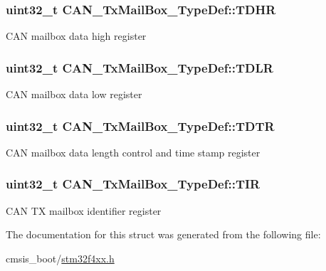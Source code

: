 \subsubsection[{\texorpdfstring{T\+D\+HR}{TDHR}}]{ uint32\+\_\+t C\+A\+N\+\_\+\+Tx\+Mail\+Box\+\_\+\+Type\+Def\+::\+T\+D\+HR}\hypertarget{struct_c_a_n___tx_mail_box___type_def_a98c6bcd7c9bae378ebf83fd9f5b59020}{}\label{struct_c_a_n___tx_mail_box___type_def_a98c6bcd7c9bae378ebf83fd9f5b59020}
C\+AN mailbox data high register 
\subsubsection[{\texorpdfstring{T\+D\+LR}{TDLR}}]{ uint32\+\_\+t C\+A\+N\+\_\+\+Tx\+Mail\+Box\+\_\+\+Type\+Def\+::\+T\+D\+LR}\hypertarget{struct_c_a_n___tx_mail_box___type_def_a408c96501b1cc8bd527432736d132a39}{}\label{struct_c_a_n___tx_mail_box___type_def_a408c96501b1cc8bd527432736d132a39}
C\+AN mailbox data low register 
\subsubsection[{\texorpdfstring{T\+D\+TR}{TDTR}}]{ uint32\+\_\+t C\+A\+N\+\_\+\+Tx\+Mail\+Box\+\_\+\+Type\+Def\+::\+T\+D\+TR}\hypertarget{struct_c_a_n___tx_mail_box___type_def_a2351cb865d064cf75f61642aaa887f76}{}\label{struct_c_a_n___tx_mail_box___type_def_a2351cb865d064cf75f61642aaa887f76}
C\+AN mailbox data length control and time stamp register 
\subsubsection[{\texorpdfstring{T\+IR}{TIR}}]{ uint32\+\_\+t C\+A\+N\+\_\+\+Tx\+Mail\+Box\+\_\+\+Type\+Def\+::\+T\+IR}\hypertarget{struct_c_a_n___tx_mail_box___type_def_a22f525c909de2dcec1d4093fe1d562b8}{}\label{struct_c_a_n___tx_mail_box___type_def_a22f525c909de2dcec1d4093fe1d562b8}
C\+AN TX mailbox identifier register 

The documentation for this struct was generated from the following file\+:\begin{DoxyCompactItemize}
\item 
cmsis\+\_\+boot/\hyperlink{stm32f4xx_8h}{stm32f4xx.\+h}\end{DoxyCompactItemize}
